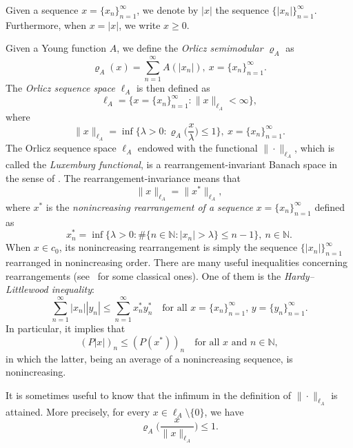 \documentclass[nointlimits]{amsart}
\numberwithin{equation}{section}
\theoremstyle{plain}
\theoremstyle{definition}
\newcommand{\N}{\mathbb{N}}
\newcommand{\lA}{\ell_A}
\newcommand{\rA}{\varrho_A}
\begin{document}
Given a sequence $x=\{x_n\}_{n=1}^\infty$, we denote by $|x|$ the sequence $\{|x_n|\}_{n = 1}^\infty$. Furthermore, when $x=|x|$, we write $x\geq0$.

Given a Young function $A$, we define the \emph{Orlicz semimodular} $\rA$ as
\begin{equation*}
    \rA(x) = \sum_{n = 1}^\infty A(|x_n|),\ x=\{x_n\}_{n=1}^\infty.
\end{equation*}
The \emph{Orlicz sequence space} $\lA$ is then defined as
\begin{equation*}
	\lA = \{x=\{x_n\}_{n=1}^\infty: \|x\|_{\lA} < \infty\},
\end{equation*}
where
\begin{equation*}
	\|x\|_{\lA} =
		\inf\Big\{
			\lambda>0: \rA\Big(\frac{x}{\lambda}\Big) \le 1 \Big\},\ x=\{x_n\}_{n=1}^\infty.
\end{equation*}
The Orlicz sequence space $\lA$ endowed with the functional $\|\cdot\|_{\lA}$, which is called the \emph{Luxemburg functional}, is a rearrangement-invariant Banach space in the sense of \cite{BS}. The rearrangement-invariance means that
\begin{equation}\label{prel:Lux_norm_ri}
    \|x\|_{\lA} = \|x^*\|_{\lA},
\end{equation}
where $x^*$ is the \emph{nonincreasing rearrangement of a sequence} $x=\{x_n\}_{n=1}^\infty$ defined as
\begin{equation*}
    x^*_n = \inf\{\lambda>0: \#\{n\in\N: |x_n| > \lambda \}\leq n - 1\},\ n\in\N.
\end{equation*}
When $x\in c_0$, its nonincreasing rearrangement is simply the sequence $\{|x_n|\}_{n=1}^\infty$ rearranged in nonincreasing order. There are many useful inequalities concerning rearrangements (see~\cite{Har:88} for some classical ones). One of them is the \emph{Hardy--Littlewood inequality}:
\begin{equation*}
    \sum_{n = 1}^\infty |x_n||y_n| \leq \sum_{n = 1}^\infty x^*_n y^*_n \quad \text{for all $x=\{x_n\}_{n=1}^\infty$, $y=\{y_n\}_{n=1}^\infty$}.
\end{equation*}
In particular, it implies that
\begin{equation}\label{prel:HL_on_P}
    (P|x|)_n \leq (P(x^*))_n \quad \text{for all $x$ and $n\in\N$},
\end{equation}
in which the latter, being an average of a nonincreasing sequence, is nonincreasing.

It is sometimes useful to know that the infimum in the definition of $\|\cdot\|_{\lA}$ is attained. More precisely, for every $x\in\lA\setminus\{0\}$, we have
\begin{equation}\label{prel:inf_att_by_Lux_norm}
    \rA\Big( \frac{x}{\|x\|_{\lA}} \Big) \leq 1.
\end{equation}
\end{document}
